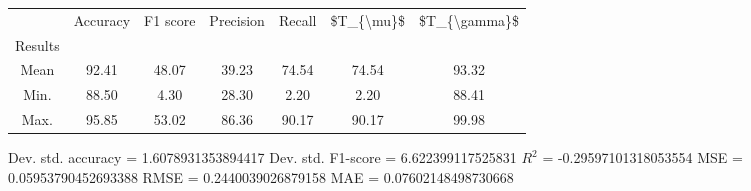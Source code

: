 \begin{tabular}{|c|c|c|c|c|c|c|}
\toprule
{} &  Accuracy &  F1 score &  Precision &  Recall &  \$T\_\{\textbackslash mu\}\$ &  \$T\_\{\textbackslash gamma\}\$ \\
Results &           &           &            &         &            &               \\
\hline
Mean    &     92.41 &     48.07 &      39.23 &   74.54 &      74.54 &         93.32 \\
Min.    &     88.50 &      4.30 &      28.30 &    2.20 &       2.20 &         88.41 \\
Max.    &     95.85 &     53.02 &      86.36 &   90.17 &      90.17 &         99.98 \\
\bottomrule
\end{tabular}

 Dev. std. accuracy = 1.6078931353894417
 Dev. std. F1-score = 6.622399117525831
 $R^2$ = -0.29597101318053554
 MSE = 0.05953790452693388
 RMSE = 0.2440039026879158
 MAE = 0.07602148498730668